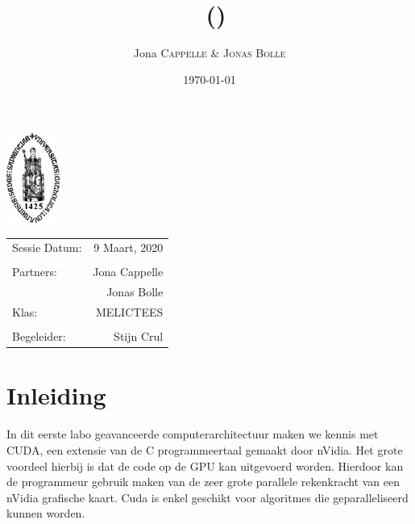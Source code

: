 \documentclass[twoside,a4paper]{article}
\title{\maintitle \\ \course \\{\small\ (\coursenumber)}} %
\author{Jona \textsc{Cappelle} \& \textsc{Jonas Bolle}} %
\date{\today} %
\newcommand{\class}{MELICTEES}
\begin{document}
\sloppy %
\begin{titlepage}
\maketitle %

\vfill
\begin{center}
\includegraphics[width=0.13\textwidth]{logo_kuleuven.png} %
\end{center}
\vfill
\vfill
\vfill

\begin{center}
\begin{tabular}{l r}
Sessie Datum: & 9 Maart, 2020 \\ %
\\
Partners: &  Jona Cappelle\\ %
&  Jonas Bolle\\
Klas: & \class \\
\\
Begeleider: &  Stijn Crul%
\end{tabular}
\end{center}
\vfill
\vfill
\end{titlepage}
\clearpage
\newpage\null\thispagestyle{empty}\newpage %



\restoregeometry%

\tableofcontents
\listoffigures
\listoftables
\clearpage

\section{Inleiding}
In dit eerste labo geavanceerde computerarchitectuur maken we kennis met CUDA, een extensie van de C programmeertaal gemaakt door nVidia. Het grote voordeel hierbij is dat de code op de GPU kan uitgevoerd worden. Hierdoor kan de programmeur gebruik maken van de zeer grote parallele rekenkracht van een nVidia grafische kaart. Cuda is enkel geschikt voor algoritmes die geparalleliseerd kunnen worden.
\end{document}
